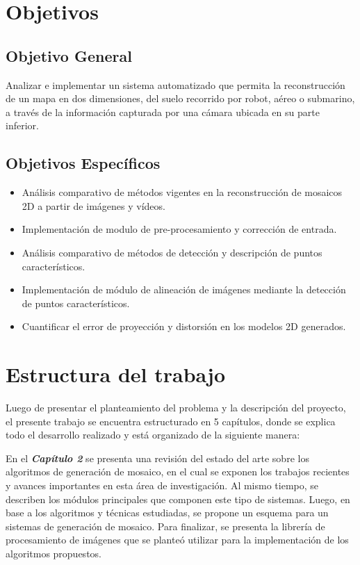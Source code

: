 \section{Objetivos}

\subsection{Objetivo General}

Analizar e implementar un sistema automatizado que permita la reconstrucción de un mapa en dos dimensiones, del suelo recorrido por robot, aéreo o submarino, a través de la información capturada por una cámara ubicada en su parte inferior.

\subsection{Objetivos Específicos}

\begin{itemize}
	\item Análisis comparativo de métodos vigentes en la reconstrucción de mosaicos 2D a partir de imágenes y vídeos.
	\item Implementación de modulo de pre-procesamiento y corrección de entrada.
	\item Análisis comparativo de métodos de detección y descripción de puntos característicos.
	\item Implementación de módulo de alineación de imágenes mediante la detección de puntos característicos.
	\item Cuantificar el error de proyección y distorsión en los modelos 2D generados.
\end{itemize}

\section{Estructura del trabajo}

Luego de presentar el planteamiento del problema y la descripción del proyecto, el presente trabajo se encuentra estructurado en 5 capítulos, donde se explica todo el desarrollo realizado y está organizado de la siguiente manera:

En el \textit{\textbf{Capítulo 2}} se presenta una revisión del estado del arte sobre los algoritmos de generación de mosaico, en el cual se exponen los trabajos recientes y avances importantes en esta área de investigación. Al mismo tiempo, se describen los módulos principales que componen este tipo de sistemas. Luego, en base a los algoritmos y técnicas estudiadas, se propone un esquema para un sistemas de generación de mosaico. Para finalizar, se presenta la librería de procesamiento de imágenes que se planteó utilizar para la implementación de los algoritmos propuestos.

